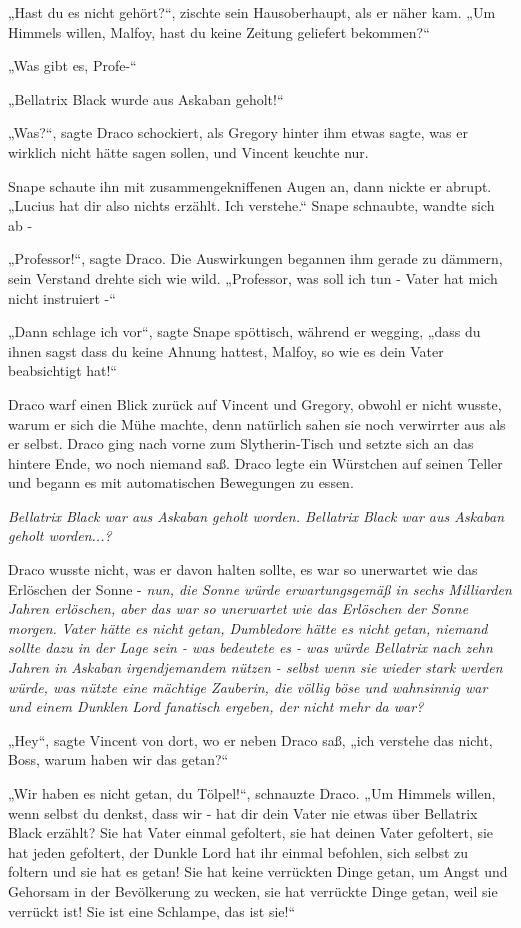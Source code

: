 {„Hast du es nicht gehört?“, zischte sein Hausoberhaupt, als er näher kam. „Um Himmels willen, Malfoy, hast du keine Zeitung geliefert bekommen?“

„Was gibt es, Profe-“

„Bellatrix Black wurde aus Askaban geholt!“

„Was?“, sagte Draco schockiert, als Gregory hinter ihm etwas sagte, was er wirklich nicht hätte sagen sollen, und Vincent keuchte nur.

Snape schaute ihn mit zusammengekniffenen Augen an, dann nickte er abrupt. „Lucius hat dir also nichts erzählt. Ich verstehe.“ Snape schnaubte, wandte sich ab -

„Professor!“, sagte Draco. Die Auswirkungen begannen ihm gerade zu dämmern, sein Verstand drehte sich wie wild. „Professor, was soll ich tun - Vater hat mich nicht instruiert -“

„Dann schlage ich vor“, sagte Snape spöttisch, während er wegging, „dass du ihnen sagst dass du keine Ahnung hattest, Malfoy, so wie es dein Vater beabsichtigt hat!“

Draco warf einen Blick zurück auf Vincent und Gregory, obwohl er nicht wusste, warum er sich die Mühe machte, denn natürlich sahen sie noch verwirrter aus als er selbst. Draco ging nach vorne zum Slytherin-Tisch und setzte sich an das hintere Ende, wo noch niemand saß. Draco legte ein Würstchen auf seinen Teller und begann es mit automatischen Bewegungen zu essen.

\emph{Bellatrix Black war aus Askaban geholt worden. Bellatrix Black war aus Askaban geholt worden...?}

Draco wusste nicht, was er davon halten sollte, es war so unerwartet wie das Erlöschen der Sonne - \emph{nun, die Sonne würde erwartungsgemäß in sechs Milliarden Jahren erlöschen, aber das war so unerwartet wie das Erlöschen der Sonne morgen.} \emph{Vater hätte es nicht getan, Dumbledore hätte es nicht getan, niemand sollte dazu in der Lage sein - was bedeutete es - was würde Bellatrix nach zehn Jahren in Askaban irgendjemandem nützen - selbst wenn sie wieder stark werden würde, was nützte eine mächtige Zauberin, die völlig böse und wahnsinnig war und einem Dunklen Lord fanatisch ergeben, der nicht mehr da war?}

„Hey“, sagte Vincent von dort, wo er neben Draco saß, „ich verstehe das nicht, Boss, warum haben wir das getan?“

„Wir haben es nicht getan, du Tölpel!“, schnauzte Draco. „Um Himmels willen, wenn selbst du denkst, dass wir - hat dir dein Vater nie etwas über Bellatrix Black erzählt? Sie hat Vater einmal gefoltert, sie hat deinen Vater gefoltert, sie hat jeden gefoltert, der Dunkle Lord hat ihr einmal befohlen, sich selbst zu foltern und sie hat es getan! Sie hat keine verrückten Dinge getan, um Angst und Gehorsam in der Bevölkerung zu wecken, sie hat verrückte Dinge getan, weil sie verrückt ist! Sie ist eine Schlampe, das ist sie!“

}

